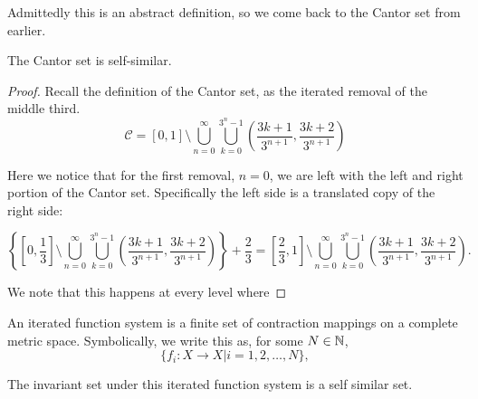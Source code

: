 Admittedly this is an abstract definition, so we come back to the Cantor set from earlier.  
\begin{claim}The Cantor set is self-similar.   
\end{claim}
\begin{proof}
    Recall the definition of the Cantor set, as the iterated removal of the middle third.      
    $$\mathcal{C} = [0,1] \setminus \bigcup_{n=0}^\infty\bigcup_{k=0}^{3^n-1}\left(\frac{3k+1}{3^{n+1}},\frac{3k+2}{3^{n+1}}\right)$$

    Here we notice that for the first removal, $n = 0$, we are left with the left and right portion of the Cantor set.  Specifically the left side is a translated copy of the right side:

    $$\left\{ \left[0,\frac{1}{3}\right] \setminus \bigcup_{n=0}^\infty\bigcup_{k=0}^{3^n-1}\left(\frac{3k+1}{3^{n+1}},\frac{3k+2}{3^{n+1}}\right) \right\} + \frac{2}{3} = \left[\frac{2}{3},1\right] \setminus \bigcup_{n=0}^\infty\bigcup_{k=0}^{3^n-1}\left(\frac{3k+1}{3^{n+1}},\frac{3k+2}{3^{n+1}}\right).$$

    We note that this happens at every level where 

\end{proof}
\begin{definition}
    An iterated function system is a finite set of contraction mappings on a complete metric space.  Symbolically, we write this as, for some $N \in \mathbb{N}$,
    $$\{f_i:X \to X \vert i = 1,2,\dots, N\}, $$
\end{definition}

The invariant set under this iterated function system is a self similar set.